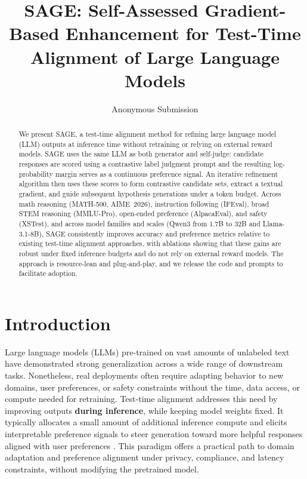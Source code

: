\documentclass[letterpaper]{article} %
\title{SAGE: Self-Assessed Gradient-Based Enhancement for Test-Time Alignment of Large Language Models}
\author{
    Anonymous Submission
}
\newcommand{\method}{SAGE}
\begin{document}
\maketitle

\begin{abstract}
We present \method{}, a test-time alignment method for refining large language model (LLM) outputs at inference time without retraining or relying on external reward models. \method{} uses the same LLM as both generator and self-judge: candidate responses are scored using a contrastive label judgment prompt and the resulting log-probability margin serves as a continuous preference signal. An iterative refinement algorithm then uses these scores to form \textcolor{orange!85!black}{contrastive candidate sets}, extract a textual gradient, and guide subsequent hypothesis generations under a token budget.
Across \textcolor{orange!85!black}{math reasoning (MATH-500, AIME~2026), instruction following (IFEval), broad STEM reasoning (MMLU-Pro), open-ended preference (AlpacaEval), and safety (XSTest)}, and \textcolor{orange!85!black}{across model families and scales (Qwen3 from 1.7B to 32B and Llama-3.1-8B)}, \method{} consistently improves accuracy and preference metrics relative to existing test-time alignment approaches, with ablations showing that these gains are robust under fixed inference budgets and do not rely on external reward models. The approach is resource-lean and plug-and-play, and we release the code and prompts to facilitate adoption.
\end{abstract}


\section{Introduction}


Large language models (LLMs) pre-trained on vast amounts of unlabeled text have demonstrated strong generalization across a wide range of downstream tasks. Nonetheless, real deployments often require adapting behavior to new domains, user preferences, or safety constraints without the time, data access, or compute needed for retraining. Test-time alignment addresses this need by improving outputs \textbf{during inference}, while keeping model weights fixed. It typically allocates a small amount of additional inference compute and elicits interpretable preference signals to steer generation toward more helpful responses aligned with user preferences \cite{litest}. This paradigm offers a practical path to domain adaptation and preference alignment under privacy, compliance, and latency constraints, without modifying the pretrained model.
\end{document}
